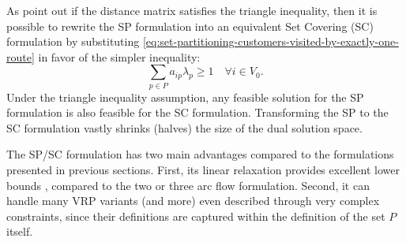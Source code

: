 As \textcite{toth2002} point out if the distance matrix satisfies the triangle inequality,
then it is possible to rewrite the SP formulation into an equivalent Set Covering (SC) formulation
by substituting \cref{eq:set-partitioning-customers-visited-by-exactly-one-route}
in favor of the simpler inequality:
\begin{equation}\label{eq:set-covering-customers-visited-by-exactly-one-route}
	\sum_{p \in P}  a_{ip} \lambda_p \ge 1  \quad \forall i \in V_0.
\end{equation}
Under the triangle inequality assumption,
any feasible solution for the SP formulation is also feasible for the SC formulation.
Transforming the SP to the SC formulation vastly shrinks (halves) the size of the dual solution space.

\medskip

The SP/SC formulation has two main advantages compared to the formulations presented in previous sections.
First, its linear relaxation provides excellent lower bounds \parencite{bramel1997},
compared to the two or three arc flow formulation.
Second, it can handle many VRP variants (and more)
even described through very complex constraints,
since their definitions are captured within the definition of the set $P$ itself.
